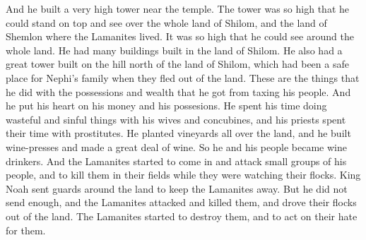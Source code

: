 And he built a very high tower near the temple. The tower was so high that he could stand on top and see over the whole land of Shilom, and the land of Shemlon where the Lamanites lived. It was so high that he could see around the whole land.
\bverse \iffalse And it came to pass that he caused many buildings to be built in the land Shilom; and he caused a great tower to be built on the hill north of the land Shilom, which had been a resort for the children of Nephi at the time they fled out of the land; and thus he did do with the riches which he obtained by the taxation of his people. \fi
He had many buildings built in the land of Shilom. He also had a great tower built on the hill north of the land of Shilom, which had been a safe place for Nephi's family when they fled out of the land. These are the things that he did with the possessions and wealth that he got from taxing his people.
\bverse \iffalse And it came to pass that he placed his heart upon his riches, and he spent his time in riotous living with his wives and his concubines; and so did also his priests spend their time with harlots. \fi
And he put his heart on his money and his possesions. He spent his time doing wasteful and sinful things with his wives and concubines, and his priests spent their time with prostitutes.
\bverse \iffalse And it came to pass that he planted vineyards round about in the land; and he built wine-presses, and made wine in abundance; and therefore he became a wine-bibber, and also his people. \fi
He planted vineyards all over the land, and he built wine-presses and made a great deal of wine. So he and his people became wine drinkers.
\bverse \iffalse And it came to pass that the Lamanites began to come in upon his people, upon small numbers, and to slay them in their fields, and while they were tending their flocks. \fi
And the Lamanites started to come in and attack small groups of his people, and to kill them in their fields while they were watching their flocks.
\bverse \iffalse And king Noah sent guards round about the land to keep them off; but he did not send a sufficient number, and the Lamanites came upon them and killed them, and drove many of their flocks out of the land; thus the Lamanites began to destroy them, and to exercise their hatred upon them. \fi
King Noah sent guards around the land to keep the Lamanites away. But he did not send enough, and the Lamanites attacked and killed them, and drove their flocks out of the land. The Lamanites started to destroy them, and to act on their hate for them.
